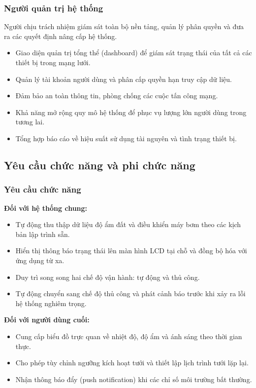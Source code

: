 \subsubsection{Người quản trị hệ thống}
Người chịu trách nhiệm giám sát toàn bộ nền tảng, quản lý phân quyền và đưa ra các quyết định nâng cấp hệ thống.
\begin{itemize}
    \item Giao diện quản trị tổng thể (dashboard) để giám sát trạng thái của tất cả các thiết bị trong mạng lưới.
    \item Quản lý tài khoản người dùng và phân cấp quyền hạn truy cập dữ liệu.
    \item Đảm bảo an toàn thông tin, phòng chống các cuộc tấn công mạng.
    \item Khả năng mở rộng quy mô hệ thống để phục vụ lượng lớn người dùng trong tương lai.
    \item Tổng hợp báo cáo về hiệu suất sử dụng tài nguyên và tình trạng thiết bị.
\end{itemize}

\subsection{Yêu cầu chức năng và phi chức năng}

\subsubsection{Yêu cầu chức năng}
\textbf{Đối với hệ thống chung:}
\begin{itemize}
    \item Tự động thu thập dữ liệu độ ẩm đất và điều khiển máy bơm theo các kịch bản lập trình sẵn.
    \item Hiển thị thông báo trạng thái lên màn hình LCD tại chỗ và đồng bộ hóa với ứng dụng từ xa.
    \item Duy trì song song hai chế độ vận hành: tự động và thủ công.
    \item Tự động chuyển sang chế độ thủ công và phát cảnh báo trước khi xảy ra lỗi hệ thống nghiêm trọng.
\end{itemize}

\textbf{Đối với người dùng cuối:}
\begin{itemize}
    \item Cung cấp biểu đồ trực quan về nhiệt độ, độ ẩm và ánh sáng theo thời gian thực.
    \item Cho phép tùy chỉnh ngưỡng kích hoạt tưới và thiết lập lịch trình tưới lặp lại.
    \item Nhận thông báo đẩy (push notification) khi các chỉ số môi trường bất thường.
\end{itemize}

